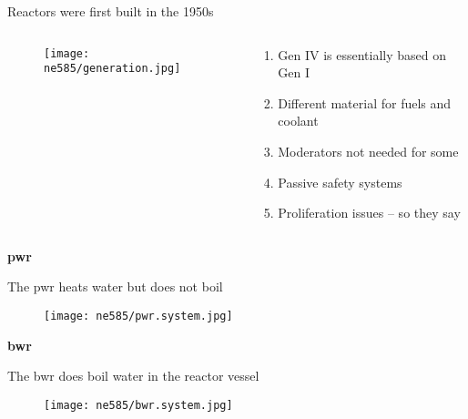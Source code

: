 \documentclass[aspectratio=1610,pdftex,dvipsnames,compress,xcolor={dvipsnames}]{beamer}
\newcommand{\acs}{\acrshort} %
\begin{document}
\addtocounter{framenumber}{-2} 
\begin{frame}{Reactors were first built in the 1950s}
    \begin{columns}[t]

        \begin{column}{0.55\textwidth}
            \begin{figure}
                \centering
                \texttt{[image: ne585/generation.jpg]}
            \end{figure}
        \end{column}

        \begin{column}{0.45\textwidth}
            \begin{enumerate}[series=outerlist,topsep=0pt,itemsep=21pt,leftmargin=*,label=(\arabic*)]
                \item[]Gen IV is essentially based on Gen I
                \item[]Different material for fuels and coolant
                \item[]Moderators not needed for some
                \item[]Passive safety systems
                \item[]Proliferation issues -- so they say
            \end{enumerate}
        \end{column}

    \end{columns}
\end{frame}


\begin{frame}[plain]{}
    \centering\LARGE\textbf{\acs{pwr}}
\end{frame}


\addtocounter{framenumber}{-1} 
\begin{frame}{The \acs{pwr} heats water but does not boil}
    \begin{figure}
        \centering
        \texttt{[image: ne585/pwr.system.jpg]}
    \end{figure}
\end{frame}


\begin{frame}[plain]{}
    \centering\LARGE\textbf{\acs{bwr}}
\end{frame}


\addtocounter{framenumber}{-1} 
\begin{frame}{The \acs{bwr} does boil water in the reactor vessel}
    \begin{figure}
        \centering
        \texttt{[image: ne585/bwr.system.jpg]}
    \end{figure}
\end{frame}
\end{document}
